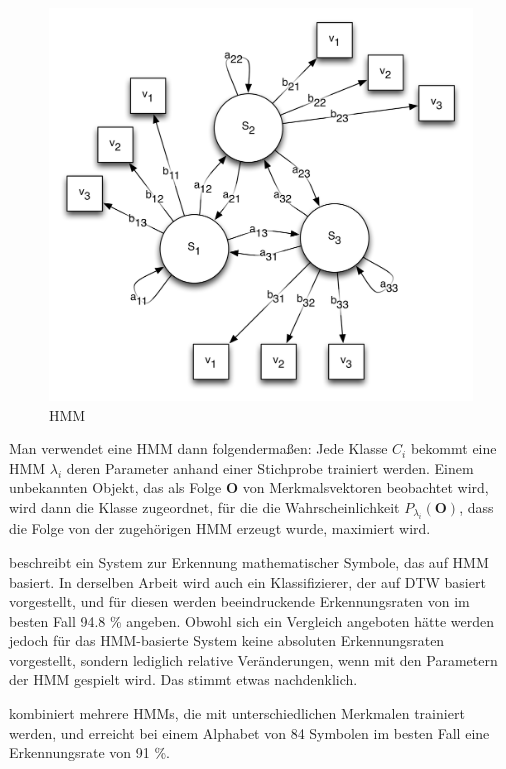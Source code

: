 \begin{figure}[htbp]
  \centering \includegraphics[width=\textwidth]{figures/hmm.png}
  \caption{HMM}
  \label{fig:hmm}
\end{figure}

Man verwendet eine HMM dann folgendermaßen: Jede Klasse $C_i$ bekommt eine HMM $\lambda_i$ deren Parameter anhand einer Stichprobe trainiert werden. Einem unbekannten Objekt, das als Folge $\mathbf{O}$ von Merkmalsvektoren beobachtet wird, wird dann die Klasse zugeordnet, für die die Wahrscheinlichkeit $P_{\lambda_i}(\mathbf{O})$, dass die Folge von der zugehörigen HMM erzeugt wurde, maximiert wird.

\citet{Xie:2007p11427} beschreibt ein System zur Erkennung mathematischer Symbole, das auf HMM basiert. In derselben Arbeit wird auch ein Klassifizierer, der auf DTW basiert vorgestellt, und für diesen werden beeindruckende Erkennungsraten von im besten Fall 94.8 \% angeben. Obwohl sich ein Vergleich angeboten hätte werden jedoch für das HMM-basierte System keine absoluten Erkennungsraten vorgestellt, sondern lediglich relative Veränderungen, wenn mit den Parametern der HMM gespielt wird. Das stimmt etwas nachdenklich.

\citet{Winkler:1996p11716} kombiniert mehrere HMMs, die mit unterschiedlichen Merkmalen trainiert werden, und erreicht bei einem Alphabet von 84 Symbolen im besten Fall eine Erkennungsrate von 91 \%.

